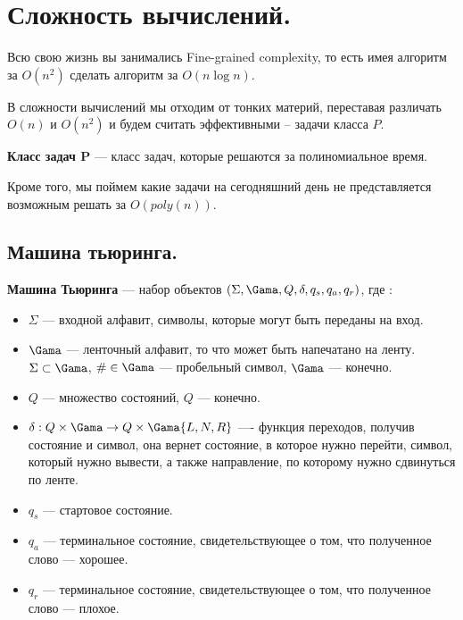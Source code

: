 \section{Сложность вычислений.}%
\label{sec:Сложность вычислений.}

Всю свою жизнь вы занимались Fine-grained complexity, 
то есть имея алгоритм за $O(n^2)$ сделать алгоритм за  $O(n\log n)$.

В сложности вычислений мы отходим от тонких материй, переставая различать $O(n)$ и  $O(n^2)$ 
и будем считать эффективными -- задачи класса  $P$.

\begin{Def}
    \textbf{Класс задач P} --- класс задач, которые решаются за полиномиальное время.
\end{Def}

Кроме того, мы поймем какие задачи на сегодняшний день не представляется возможным решать за $O(poly(n))$.

\subsection{Машина тьюринга.}%
\label{sub:Машина тьюринга.}
\begin{Def}
    \textbf{Машина Тьюринга} --- набор объектов $(\Sigma, \Gama, Q, \delta, q_s, q_a, q_r)$, где :
    \begin{itemize}
        \item $\Sigma$ --- входной алфавит, символы, которые могут быть переданы на вход.
        \item $\Gama$ --- ленточный алфавит, то что может быть напечатано на ленту. 
            $\Sigma \subset \Gama$, $\# \in \Gama$ --- пробельный символ, $\Gama$ --- конечно.
        \item $Q$ --- множество состояний, $Q$ --- конечно.
        \item $\delta: Q \times \Gama \to Q \times \Gama \{L, N, R\}$ ---- функция переходов, 
            получив состояние и символ, она вернет состояние, в которое нужно перейти, символ, который нужно вывести, 
            а также направление, по которому нужно сдвинуться по ленте.
        \item $q_s$ --- стартовое состояние.
        \item $q_a$ --- терминальное состояние, свидетельствующее о том, что полученное слово --- хорошее.
        \item $q_r$ --- терминальное состояние, свидетельствующее о том, что полученное слово --- плохое.
    \end{itemize}
\end{Def}

